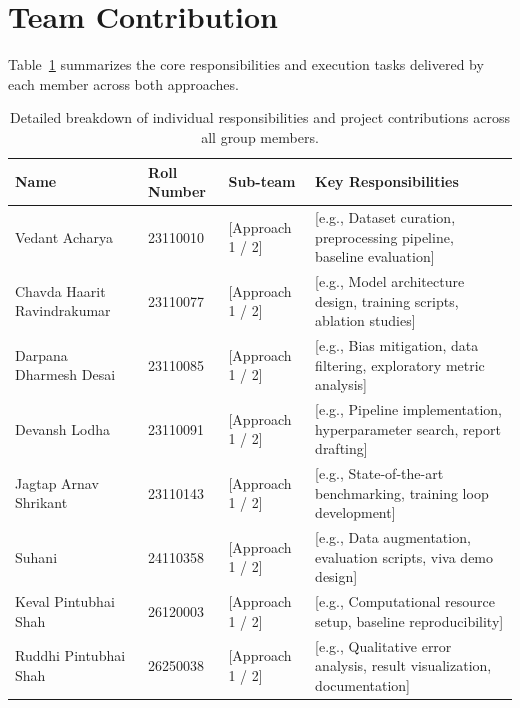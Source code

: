 \section*{Team Contribution}
\label{sec:team_contribution}


Table~\ref{tab:team_contribution} summarizes the core responsibilities and execution tasks delivered by each member across both approaches.

\begin{table}[t]
\centering
\small
\begin{tabular}{lllp{6.8cm}}
\toprule
Name & Roll Number & Sub-team & Key Responsibilities \\
\midrule
Vedant Acharya & 23110010 & [Approach 1 / 2] & [e.g., Dataset curation, preprocessing pipeline, baseline evaluation] \\
Chavda Haarit Ravindrakumar & 23110077 & [Approach 1 / 2] & [e.g., Model architecture design, training scripts, ablation studies] \\
Darpana Dharmesh Desai & 23110085 & [Approach 1 / 2] & [e.g., Bias mitigation, data filtering, exploratory metric analysis] \\
Devansh Lodha & 23110091 & [Approach 1 / 2] & [e.g., Pipeline implementation, hyperparameter search, report drafting] \\
Jagtap Arnav Shrikant & 23110143 & [Approach 1 / 2] & [e.g., State-of-the-art benchmarking, training loop development] \\
Suhani & 24110358 & [Approach 1 / 2] & [e.g., Data augmentation, evaluation scripts, viva demo design] \\
Keval Pintubhai Shah & 26120003 & [Approach 1 / 2] & [e.g., Computational resource setup, baseline reproducibility] \\
Ruddhi Pintubhai Shah & 26250038 & [Approach 1 / 2] & [e.g., Qualitative error analysis, result visualization, documentation] \\
\bottomrule
\end{tabular}
\caption{Detailed breakdown of individual responsibilities and project contributions across all group members.}
\label{tab:team_contribution}
\end{table}
